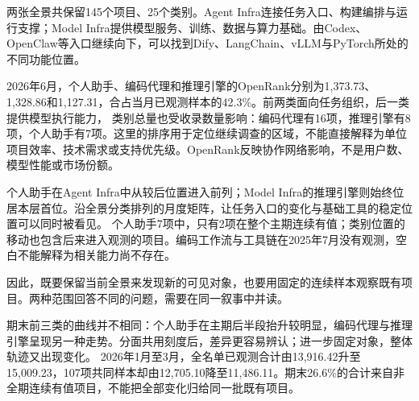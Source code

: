 
两张全景共保留145个项目、25个类别。Agent Infra连接任务入口、构建编排与运行支撑；Model Infra提供模型服务、训练、数据与算力基础。由Codex、OpenClaw等入口继续向下，可以找到Dify、LangChain、vLLM与PyTorch所处的不同功能位置。

2026年6月，个人助手、编码代理和推理引擎的OpenRank分别为1,373.73、1,328.86和1,127.31，合占当月已观测样本的42.3\%。前两类面向任务组织，后一类提供模型执行能力，
类别总量也受收录数量影响：编码代理有16项，推理引擎有8项，个人助手有7项。这里的排序用于定位继续调查的区域，不能直接解释为单位项目效率、技术需求或支持优先级。OpenRank反映协作网络影响，不是用户数、模型性能或市场份额。

个人助手在Agent Infra中从较后位置进入前列；Model Infra的推理引擎则始终位居本层首位。沿全景分类排列的月度矩阵，让任务入口的变化与基础工具的稳定位置可以同时被看见。
个人助手7项中，只有2项在整个主期连续有值；类别位置的移动也包含后来进入观测的项目。编码工作流与工具链在2025年7月没有观测，空白不能解释为相关能力尚不存在。

因此，既要保留当前全景来发现新的可见对象，也要用固定的连续样本观察既有项目。两种范围回答不同的问题，需要在同一叙事中并读。

期末前三类的曲线并不相同：个人助手在主期后半段抬升较明显，编码代理与推理引擎呈现另一种走势。分面共用刻度后，差异更容易辨认；进一步固定对象，整体轨迹又出现变化。
2026年1月至3月，全名单已观测合计由13,916.42升至15,009.23，107项共同样本却由12,705.10降至11,486.11。期末26.6\%的合计来自非全期连续有值项目，不能把全部变化归给同一批既有项目。

